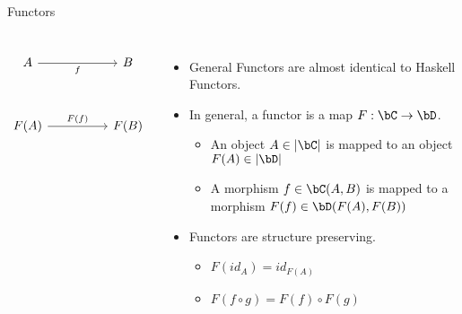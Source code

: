 \begin{frame}[fragile]{Functors}
\begin{columns}
\[\begin{tikzcd}
	A && B \\
	\\
	{F(A)} && {F(B)}
	\arrow["f"', from=1-1, to=1-3]
	\arrow["{F(f)}", from=3-1, to=3-3]
\end{tikzcd}\]
\begin{itemize}
 \item General Functors are almost identical to Haskell Functors.
 \pause\item In general, a functor is a map $F : \bC \to \bD$.
 \begin{itemize}
  \pause\item An object $A \in |\bC|$ is mapped to an object $F(A) \in |\bD|$
  \pause\item A morphism $f \in \bC(A,B)$ is mapped to a morphism $F(f) \in \bD(F(A), F(B))$
 \end{itemize}
 \pause\item Functors are structure preserving.
 \begin{itemize}
  \pause\item $F(id_A) = id_{F(A)}$
  \pause\item $F(f \circ g) = F(f) \circ F(g)$
 \end{itemize}
\end{itemize}
\end{columns}
\end{frame}
